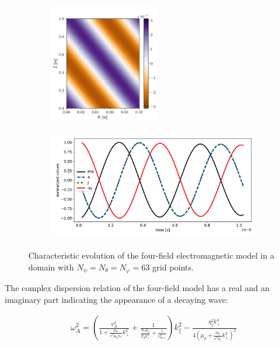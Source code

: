 \begin{figure}[H]
	\centering
	\begin{subfigure}[b]{0.3\textwidth}
		\centering
		\includegraphics[height=5.2cm]{schemes/SnapshotTransitionSLAB.jpg}
		\label{fig:electromagneticSLAB_snapshotAPara}
	\end{subfigure}
	\begin{subfigure}[b]{0.65\textwidth}
		\centering
		\includegraphics[height=4.8cm]{schemes/evolutionTransitionSlab.jpg}
		\label{fig:electromagneticSLAB_evolution}
	\end{subfigure}
	\caption[Characteristic evolution of the four-field electromagnetic model in a domain with $N_\psi=N_\theta=N_\varphi=63$ grid points]{Characteristic evolution of the four-field electromagnetic model in a domain with $N_\psi=N_\theta=N_\varphi=63$ grid points.}
	\label{fig:electromagneticSLAB_fourFieldModel}
\end{figure}

The complex dispersion relation of the four-field model has a real and an imaginary part indicating the appearance of a decaying wave:

\begin{align}
	\label{eq:VV_dispersionRelation}
	\omega_A^2 = \left(\frac{v_A^2}{1 + \frac{m_e}{e^2 \mu_0 n_e} k_\perp^2} + \frac{1}{\frac{n_e \mu_0}{T_0 k_\perp^2} + \frac{1}{v_{th,e}^2}}\right) k_\parallel^2 - \frac{\eta_\parallel^2k_\perp^4}{4\left(\mu_0+\frac{m_e}{e^2n_i}k_\perp^2\right)^2}
\end{align}

